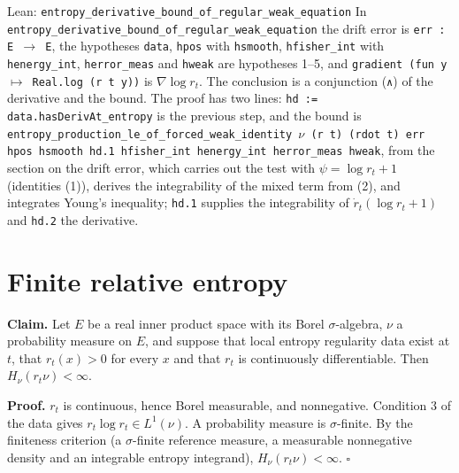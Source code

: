 \documentclass[11pt,a4paper]{article}
\begin{document}
\begin{leanbox}{Lean: \texttt{entropy\_\allowbreak{}derivative\_\allowbreak{}bound\_\allowbreak{}of\_\allowbreak{}regular\_\allowbreak{}weak\_\allowbreak{}equation}}
In \texttt{entropy\_\allowbreak{}derivative\_\allowbreak{}bound\_\allowbreak{}of\_\allowbreak{}regular\_\allowbreak{}weak\_\allowbreak{}equation} the drift error is \texttt{err : E \ensuremath{\to} E}, the hypotheses \texttt{data}, \texttt{hpos} with \texttt{hsmooth}, \texttt{hfisher\_\allowbreak{}int} with \texttt{henergy\_\allowbreak{}int}, \texttt{herror\_\allowbreak{}meas} and \texttt{hweak} are hypotheses 1–5, and \texttt{gradient (fun y \ensuremath{\mapsto} Real.\allowbreak{}log (r t y))} is \(\nabla\log r_t\). The conclusion is a conjunction (\texttt{∧}) of the derivative and the bound. The proof has two lines: \texttt{hd := data.\allowbreak{}has\allowbreak{}Deriv\allowbreak{}At\_\allowbreak{}entropy} is the previous step, and the bound is \texttt{entropy\_\allowbreak{}production\_\allowbreak{}le\_\allowbreak{}of\_\allowbreak{}forced\_\allowbreak{}weak\_\allowbreak{}identity \ensuremath{\nu} (r t) (rdot t) err hpos hsmooth hd.\allowbreak{}1 hfisher\_\allowbreak{}int henergy\_\allowbreak{}int herror\_\allowbreak{}meas hweak}, from the section on the drift error, which carries out the test with \(\psi=\log r_t+1\) (identities (1)), derives the integrability of the mixed term from (2), and integrates Young's inequality; \texttt{hd.\allowbreak{}1} supplies the integrability of \(\dot r_t(\log r_t+1)\) and \texttt{hd.\allowbreak{}2} the derivative.
\end{leanbox}

\section{\texorpdfstring{Finite relative entropy}{Finite relative entropy}}


\textbf{Claim.} Let \(E\) be a real inner product space with its Borel \(\sigma\)-algebra, \(\nu\) a probability measure on \(E\), and suppose that local entropy regularity data exist at \(t\), that \(r_t(x)>0\) for every \(x\) and that \(r_t\) is continuously differentiable. Then \(H_\nu(r_t\nu)<\infty\).




\textbf{Proof.} \(r_t\) is continuous, hence Borel measurable, and nonnegative. Condition 3 of the data gives \(r_t\log r_t\in L^1(\nu)\). A probability measure is \(\sigma\)-finite. By the finiteness criterion \cite[Section~3.4.4]{LangevinLean2026ULALSI} (a \(\sigma\)-finite reference measure, a measurable nonnegative density and an integrable entropy integrand), \(H_\nu(r_t\nu)<\infty\). \(\square\)
\end{document}
